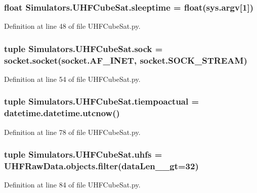 \subsubsection[{sleeptime}]{\setlength{\rightskip}{0pt plus 5cm}float Simulators.\+U\+H\+F\+Cube\+Sat.\+sleeptime = float(sys.\+argv\mbox{[}1\mbox{]})}\label{namespace_simulators_1_1_u_h_f_cube_sat_ab0affb04a9081bd0b75db4400d92fa2e}


Definition at line 48 of file U\+H\+F\+Cube\+Sat.\+py.

\hypertarget{namespace_simulators_1_1_u_h_f_cube_sat_a51949a5e2f40cd214346438690e6ccfc}{}
\subsubsection[{sock}]{\setlength{\rightskip}{0pt plus 5cm}tuple Simulators.\+U\+H\+F\+Cube\+Sat.\+sock = socket.\+socket(socket.\+A\+F\+\_\+\+I\+N\+E\+T, socket.\+S\+O\+C\+K\+\_\+\+S\+T\+R\+E\+A\+M)}\label{namespace_simulators_1_1_u_h_f_cube_sat_a51949a5e2f40cd214346438690e6ccfc}


Definition at line 54 of file U\+H\+F\+Cube\+Sat.\+py.

\hypertarget{namespace_simulators_1_1_u_h_f_cube_sat_a7fb0f7569e31bfb48df74cb2df1e8982}{}
\subsubsection[{tiempoactual}]{\setlength{\rightskip}{0pt plus 5cm}tuple Simulators.\+U\+H\+F\+Cube\+Sat.\+tiempoactual = datetime.\+datetime.\+utcnow()}\label{namespace_simulators_1_1_u_h_f_cube_sat_a7fb0f7569e31bfb48df74cb2df1e8982}


Definition at line 78 of file U\+H\+F\+Cube\+Sat.\+py.

\hypertarget{namespace_simulators_1_1_u_h_f_cube_sat_a37d8eb275fb0a949c06d80bea0726bcf}{}
\subsubsection[{uhfs}]{\setlength{\rightskip}{0pt plus 5cm}tuple Simulators.\+U\+H\+F\+Cube\+Sat.\+uhfs = U\+H\+F\+Raw\+Data.\+objects.\+filter(data\+Len\+\_\+\+\_\+gt=32)}\label{namespace_simulators_1_1_u_h_f_cube_sat_a37d8eb275fb0a949c06d80bea0726bcf}


Definition at line 84 of file U\+H\+F\+Cube\+Sat.\+py.

